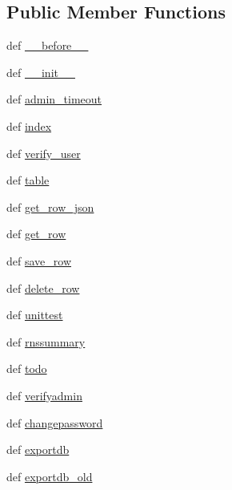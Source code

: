 \subsection*{\-Public \-Member \-Functions}
\begin{DoxyCompactItemize}
\item 
def \hyperlink{classcyberweb_1_1controllers_1_1admin_1_1_admin_controller_adb28058ee61573d715f70bfa9edc4d42}{\-\_\-\-\_\-before\-\_\-\-\_\-}
\item 
def \hyperlink{classcyberweb_1_1controllers_1_1admin_1_1_admin_controller_a7fc976d49e51accd3db235776c814711}{\-\_\-\-\_\-init\-\_\-\-\_\-}
\item 
def \hyperlink{classcyberweb_1_1controllers_1_1admin_1_1_admin_controller_a49a66459264d44340ac630b8077a9bbb}{admin\-\_\-timeout}
\item 
def \hyperlink{classcyberweb_1_1controllers_1_1admin_1_1_admin_controller_ae8a32320a51836f1cf947be80d1a01d3}{index}
\item 
def \hyperlink{classcyberweb_1_1controllers_1_1admin_1_1_admin_controller_a2ee3535f89c5c81368f79b170526a57e}{verify\-\_\-user}
\item 
def \hyperlink{classcyberweb_1_1controllers_1_1admin_1_1_admin_controller_ad55f5ca0ef10a170106964b227cab5c7}{table}
\item 
def \hyperlink{classcyberweb_1_1controllers_1_1admin_1_1_admin_controller_a9ca05d4d54bb86421fdcef670efec591}{get\-\_\-row\-\_\-json}
\item 
def \hyperlink{classcyberweb_1_1controllers_1_1admin_1_1_admin_controller_ad58e80fad6511cd42ceef52fed924cfd}{get\-\_\-row}
\item 
def \hyperlink{classcyberweb_1_1controllers_1_1admin_1_1_admin_controller_a44faf240a5b86a7f6fd02e8aea19a07a}{save\-\_\-row}
\item 
def \hyperlink{classcyberweb_1_1controllers_1_1admin_1_1_admin_controller_aa98892731ae3ce74da99f720ef4bc401}{delete\-\_\-row}
\item 
def \hyperlink{classcyberweb_1_1controllers_1_1admin_1_1_admin_controller_a5fcfd98bec325d0b975e7a43d6056d4e}{unittest}
\item 
def \hyperlink{classcyberweb_1_1controllers_1_1admin_1_1_admin_controller_a032961abfacf38e93930c091abb41da4}{rnssummary}
\item 
def \hyperlink{classcyberweb_1_1controllers_1_1admin_1_1_admin_controller_a7930b2842ff59ab5a68898615846933a}{todo}
\item 
def \hyperlink{classcyberweb_1_1controllers_1_1admin_1_1_admin_controller_ae468a32b4355bd79fa68ecadca093aca}{verifyadmin}
\item 
def \hyperlink{classcyberweb_1_1controllers_1_1admin_1_1_admin_controller_a32d1df8cd64d58bb612b62da150044b5}{changepassword}
\item 
def \hyperlink{classcyberweb_1_1controllers_1_1admin_1_1_admin_controller_a50799cf2e1ec0b25e91e673c3c7ad981}{exportdb}
\item 
def \hyperlink{classcyberweb_1_1controllers_1_1admin_1_1_admin_controller_a4a3e0381c84a7bfd36450b2e4ab1ced2}{exportdb\-\_\-old}
\end{DoxyCompactItemize}

